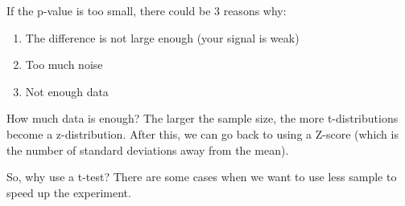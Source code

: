 \documentclass[11pt,a4paper,titlepage]{scrartcl}
\begin{document}
If the p-value is too small, there could be 3 reasons why:
\begin{enumerate}
    \item The difference is not large enough (your signal is weak)
    \item Too much noise
    \item Not enough data
\end{enumerate}

How much data is enough? The larger the sample size, the more
t-distributions become a z-distribution. After this, we can go back to
using a Z-score (which is the number of standard deviations away from the
mean).

So, why use a t-test? There are some cases when we want to use less sample
to speed up the experiment.
\end{document}
